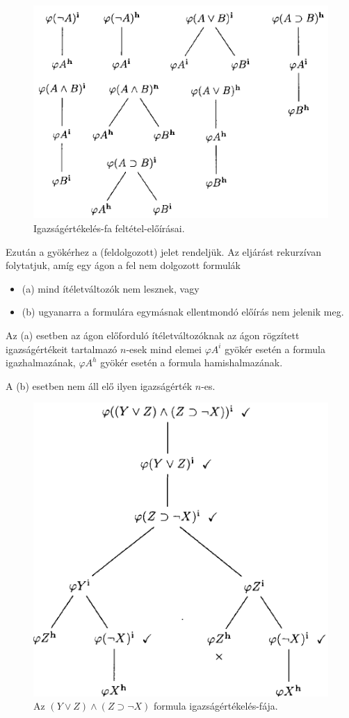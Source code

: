 \documentclass[margin=0px]{article}
\begin{document}
\begin{figure}[H]
    \centering
    \includegraphics[width=0.7\linewidth]{img/igazsagertfa}
    \caption{Igazságértékelés-fa feltétel-előírásai.}
    \label{fig:igazsagertfa}
\end{figure}

Ezután a gyökérhez a \checkmark (feldolgozott) jelet rendeljük. Az eljárást rekurzívan folytatjuk, amíg egy ágon a fel nem dolgozott
formulák

\begin{itemize}
    \item	(a) mind ítéletváltozók nem lesznek, vagy

    \item	(b) ugyanarra a formulára egymásnak ellentmondó előírás nem jelenik meg.
\end{itemize}

Az (a) esetben az ágon előforduló ítéletváltozóknak az ágon rögzített igazságértékeit tartalmazó $n$-esek mind elemei $\varphi A^{i}$
gyökér esetén a formula igazhalmazának, $\varphi A^{h}$ gyökér esetén a formula hamishalmazának.

A (b) esetben nem áll elő ilyen igazságérték $n$-es.

\begin{figure}[H]
    \centering
    \includegraphics[width=0.5\linewidth]{img/igazsagertfapelda}
    \caption{Az $(Y \vee Z) \wedge (Z \supset \neg X)$ formula igazságértékelés-fája.}
    \label{fig:igazsagertfapelda}
\end{figure}
\end{document}
